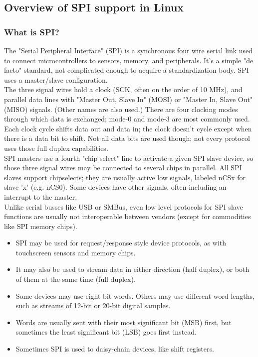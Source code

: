 \subsection{Overview of SPI support in Linux}
\subsubsection{What is SPI?}
The "Serial Peripheral Interface" (SPI) is a synchronous four wire serial link used to connect microcontrollers to sensors, memory, and peripherals. It's a simple "de facto" standard, not complicated enough to acquire a standardization body.  SPI uses a master/slave configuration.\\
The three signal wires hold a clock (SCK, often on the order of 10 MHz), and parallel data lines with "Master Out, Slave In" (MOSI) or "Master In, Slave Out" (MISO) signals.  (Other names are also used.)  There are four clocking modes through which data is exchanged; mode-0 and mode-3 are most commonly used.  Each clock cycle shifts data out and data in; the clock doesn't cycle except when there is a data bit to shift.  Not all data bits are used though; not every protocol uses those full duplex capabilities.\\
SPI masters use a fourth "chip select" line to activate a given SPI slave device, so those three signal wires may be connected to several chips in parallel.  All SPI slaves support chipselects; they are usually active low signals, labeled nCSx for slave 'x' (e.g. nCS0).  Some devices have other signals, often including an interrupt to the master. \\
Unlike serial busses like USB or SMBus, even low level protocols for SPI slave functions are usually not interoperable between vendors (except for commodities like SPI memory chips).
\begin{itemize}
	\item SPI may be used for request/response style device protocols, as with touchscreen sensors and memory chips.
	\item It may also be used to stream data in either direction (half duplex), or both of them at the same time (full duplex).
	\item Some devices may use eight bit words.  Others may use different word     lengths, such as streams of 12-bit or 20-bit digital samples.
	\item Words are usually sent with their most significant bit (MSB) first, but sometimes the least significant bit (LSB) goes first instead.
	\item Sometimes SPI is used to daisy-chain devices, like shift registers.
\end{itemize}
